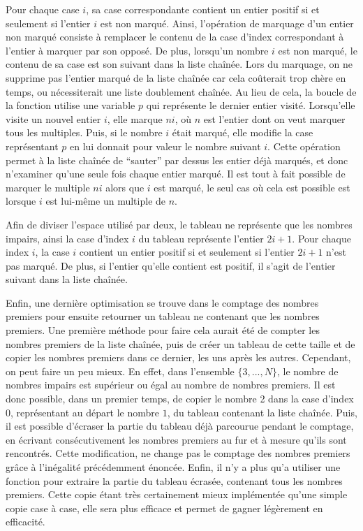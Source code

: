 \documentclass[a4paper]{easychair}
\begin{document}
Pour chaque case $i$, sa case correspondante contient un entier positif
si et seulement si l'entier $i$ est non marqué.
Ainsi, l'opération de marquage d'un entier non marqué consiste à remplacer le
contenu de la case d'index correspondant à l'entier à marquer par son opposé.
De plus, lorsqu'un nombre $i$ est non marqué, le contenu de sa case est son
suivant dans la liste chaînée.
Lors du marquage, on ne supprime pas l'entier marqué de la liste chaînée car
cela coûterait trop chère en temps, ou nécessiterait une liste doublement
chaînée. Au lieu de cela, la boucle de la fonction 
utilise une variable $p$ qui représente le dernier entier visité.
Lorsqu'elle visite un nouvel entier $i$, elle marque $ni$, où $n$ est
l'entier dont on veut marquer tous les multiples.
Puis, si le nombre $i$ était marqué, elle modifie la case représentant $p$ en lui
donnait pour valeur le nombre suivant $i$. Cette opération permet à la liste
chaînée de ``sauter'' par dessus les entier déjà marqués, et donc n'examiner
qu'une seule fois chaque entier marqué.
Il est tout à fait possible de marquer le multiple $ni$ alors que $i$ est marqué,
le seul cas où cela est possible est lorsque $i$ est lui-même un multiple de $n$.

Afin de diviser l'espace utilisé par deux, le tableau ne représente que les nombres
impairs, ainsi la case d'index $i$ du tableau représente l'entier $2i + 1$.
Pour chaque index $i$, la case $i$ contient un entier positif si et
seulement si l'entier $2i + 1$ n'est pas marqué.
De plus, si l'entier qu'elle contient est positif, il s'agit de l'entier suivant
dans la liste chaînée.

Enfin, une dernière optimisation se trouve dans le comptage des nombres premiers
pour ensuite retourner un tableau ne contenant que les nombres premiers.
Une première méthode pour faire cela aurait été de compter les nombres premiers
de la liste chaînée, puis de créer un tableau de cette taille et de copier
les nombres premiers dans ce dernier, les uns après les autres.
Cependant, on peut faire un peu mieux. En effet, dans l'ensemble $\{3,...,N\}$,
le nombre de nombres impairs est supérieur ou égal au nombre de nombres premiers.
Il est donc possible, dans un premier temps, de copier le nombre 2 dans la case
d'index 0, représentant au départ le nombre $1$, du tableau contenant la liste
chaînée. Puis, il est possible d'écraser la partie du tableau déjà parcourue
pendant le comptage, en écrivant consécutivement les nombres premiers au fur
et à mesure qu'ils sont rencontrés. Cette modification, ne change pas le comptage
des nombres premiers grâce à l'inégalité précédemment énoncée.
Enfin, il n'y a plus qu'a utiliser une fonction  pour extraire
la partie du tableau écrasée, contenant tous les nombres premiers.
Cette copie étant très certainement mieux implémentée qu'une simple copie
case à case, elle sera plus efficace et permet de gagner légèrement en efficacité.
\end{document}

